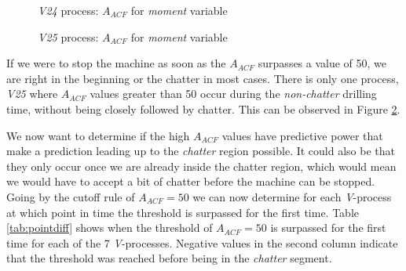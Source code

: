 \documentclass[12 pt]{scrartcl}
\begin{document}
\begin{figure}[H]
  \caption{\emph{V24} process: $A_{ACF}$ for \emph{moment} variable}
  \label{fig:v24-moment-aacf}
\end{figure}

\begin{figure}[H]
  \caption{\emph{V25} process: $A_{ACF}$ for \emph{moment} variable}
  \label{fig:v25-moment-aacf}
\end{figure}

If we were to stop the machine as soon as the $A_{ACF}$ surpasses a value of 50, we are right in the beginning or the chatter in most cases. There is only one process, \emph{V25} where $A_{ACF}$ values greater than 50 occur during the \emph{non-chatter} drilling time, without being closely followed by chatter. This can be observed in Figure \ref{fig:v25-moment-aacf}.



We now want to determine if the high $A_{ACF}$ values have predictive power that make a prediction leading up to the \emph{chatter} region possible. It could also be that they only occur once we are already inside the chatter region, which would mean we would have to accept a bit of chatter before the machine can be stopped.
Going by the cutoff rule of $A_{ACF} = 50$ we can now determine for each \emph{V}-process at which point in time the threshold is surpassed for the first time.
Table \ref{tab:pointdiff} shows when the threshold of $A_{ACF} = 50$ is surpassed for the first time for each of the 7 \emph{V}-processes. Negative values in the second column indicate that the threshold was reached before being in the \emph{chatter} segment.
\end{document}
